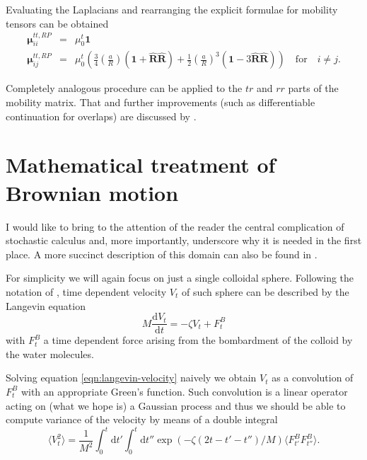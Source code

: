 \documentclass{doctoral}
\newcommand{\dd}{\mathrm{d}}
\begin{document}
Evaluating the Laplacians and rearranging the explicit formulae for mobility tensors can be obtained
\begin{eqnarray}
    \bm{\mu}_{ii}^{tt,RP} & = & \mu_0^t \bm{1}                                                                                                                                                                                                                                  \\
    \bm{\mu}_{ij}^{tt,RP} & = & \mu_0^t \left( \frac{3}{4} \left( \frac{a}{R} \right) \left( \bm{1} + \bm{\hat{R}}\bm{\hat{R}} \right) + \frac{1}{2} \left( \frac{a}{R} \right)^3 \left( \bm{1} -3  \bm{\hat{R}}\bm{\hat{R}} \right) \right) \quad \mathrm{for} \quad i \neq j.
    \label{eqn:rotne-prager-translation}
\end{eqnarray}

Completely analogous procedure can be applied to the $tr$ and $rr$ parts of the mobility matrix.
That and further improvements (such as differentiable continuation for overlaps) are discussed by \textcite{Zuk_2018}.

\section{Mathematical treatment of Brownian motion}
\label{sec:SDE}

I would like to bring to the attention of the reader the central complication of stochastic calculus and, more importantly, underscore why it is needed in the first place.
A more succinct description of this domain can also be found in \textcite{Waszkiewicz_2023_pychastic}.

For simplicity we will again focus on just a single colloidal sphere.
Following the notation of \textcite{Ottinger_2012}, time dependent velocity $V_t$ of such sphere can be described by the Langevin equation
\begin{equation}
    M \frac{\dd V_t}{\dd t} = - \zeta V_t + F^{B}_t \label{eqn:langevin-velocity}
\end{equation}
with $F^B_t$ a time dependent force arising from the bombardment of the colloid by the water molecules.

Solving equation \eqref{eqn:langevin-velocity} naively we obtain $V_t$ as a convolution of $F_t^B$ with an appropriate Green's function.
Such convolution is a linear operator acting on (what we hope is) a Gaussian process and thus we should be able to compute variance of the velocity by means of a double integral
\begin{equation}
    \langle V_t^2 \rangle = \frac{1}{M^2} \int_0^t \dd t' \int_0^t \dd t'' \exp\left(-\zeta (2t - t' - t'') / M\right) \langle F_{t'}^B F_{t''}^B \rangle.
    \label{eqn:velocity-variance-integral}
\end{equation}
\end{document}
